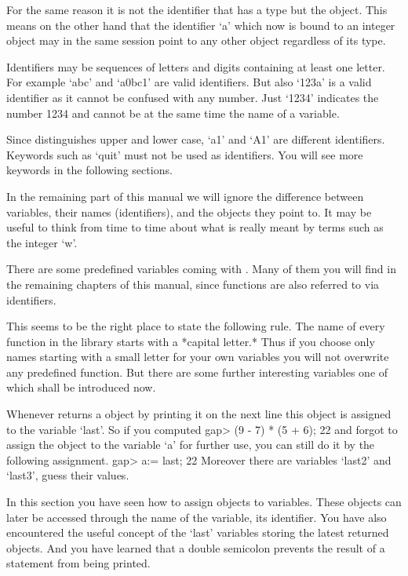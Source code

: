 For the  same reason it is  not the  identifier that has   a type but the
object.  This means  on the other hand that  the identifier `a' which now
is bound to an integer object may in the  same session point to any other
object regardless of its type.

Identifiers  may be sequences  of letters and digits containing at  least
one letter.   For example  `abc' and `a0bc1'  are valid identifiers.  But
also `123a'  is  a valid identifier as  it cannot be  confused  with  any
number.  Just `1234' indicates the  number 1234 and cannot be at the same
time the name of a variable.

Since  {\GAP} distinguishes  upper and  lower  case, `a1'  and  `A1'  are
different  identifiers.   Keywords  such as `quit'  must not  be used  as
identifiers.  You will see more keywords in the following sections.

In  the remaining  part of  this manual   we  will ignore the  difference
between variables, their names  (identifiers), and the objects they point
to.  It may be useful  to think from time  to  time about what is  really
meant by terms such as the integer `w'.

There are some predefined variables coming with {\GAP}.  Many of them you
will find in the remaining  chapters of  this manual, since functions are
also referred to via identifiers.

This seems to be the  right place to state the  following rule.  The name
of  every function in the {\GAP}  library starts with a *capital letter.*
Thus if you choose  only names starting with a  small letter for your own
variables you will  not overwrite any predefined  function. But there are
some further interesting variables one of which shall be introduced now.

Whenever {\GAP} returns a  object by printing it  on  the next  line this
object is assigned to the variable `last'.  So if you computed
\beginexample
    gap> (9 - 7) * (5 + 6);
    22 
\endexample
and forgot to assign the object to the  variable `a' for further use, you
can still do it by the following assignment.
\beginexample
    gap> a:= last;
    22 
\endexample
Moreover there are variables `last2' and `last3', guess their values.

In this section you have seen how to assign  objects to variables.  These
objects can  later   be accessed through  the  name  of the  variable, its
identifier.  You have also  encountered the useful  concept of the `last'
variables storing the latest returned objects.  And  you have learned that
a double semicolon prevents the result of a statement from being printed.


